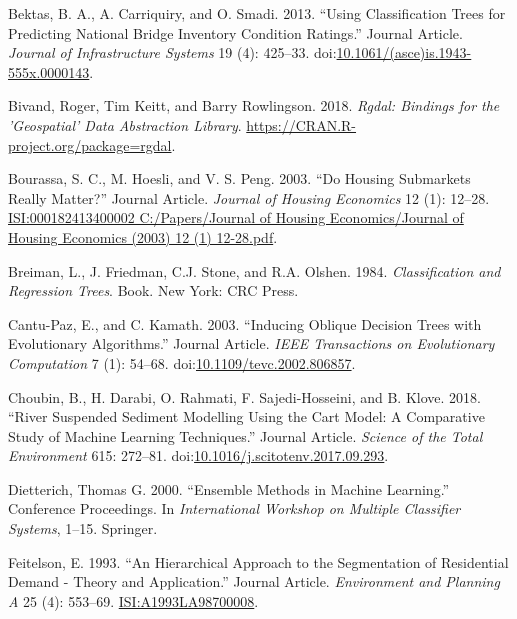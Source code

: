\documentclass[]{elsarticle} %
\begin{document}
\hypertarget{ref-Bektas2013}{}
Bektas, B. A., A. Carriquiry, and O. Smadi. 2013. ``Using Classification
Trees for Predicting National Bridge Inventory Condition Ratings.''
Journal Article. \emph{Journal of Infrastructure Systems} 19 (4):
425--33.
doi:\href{https://doi.org/10.1061/(asce)is.1943-555x.0000143}{10.1061/(asce)is.1943-555x.0000143}.

\hypertarget{ref-Bivand2018}{}
Bivand, Roger, Tim Keitt, and Barry Rowlingson. 2018. \emph{Rgdal:
Bindings for the 'Geospatial' Data Abstraction Library}.
\url{https://CRAN.R-project.org/package=rgdal}.

\hypertarget{ref-Bourassa2003}{}
Bourassa, S. C., M. Hoesli, and V. S. Peng. 2003. ``Do Housing
Submarkets Really Matter?'' Journal Article. \emph{Journal of Housing
Economics} 12 (1): 12--28.
\href{ISI:000182413400002\%0AC:/Papers/Journal\%20of\%20Housing\%20Economics/Journal\%20of\%20Housing\%20Economics\%20(2003)\%2012\%20(1)\%2012-28.pdf}{ISI:000182413400002
C:/Papers/Journal of Housing Economics/Journal of Housing Economics (2003) 12 (1) 12-28.pdf}.

\hypertarget{ref-Breiman1984}{}
Breiman, L., J. Friedman, C.J. Stone, and R.A. Olshen. 1984.
\emph{Classification and Regression Trees}. Book. New York: CRC Press.

\hypertarget{ref-Cantu-Paz2003}{}
Cantu-Paz, E., and C. Kamath. 2003. ``Inducing Oblique Decision Trees
with Evolutionary Algorithms.'' Journal Article. \emph{IEEE Transactions
on Evolutionary Computation} 7 (1): 54--68.
doi:\href{https://doi.org/10.1109/tevc.2002.806857}{10.1109/tevc.2002.806857}.

\hypertarget{ref-Choubin2018}{}
Choubin, B., H. Darabi, O. Rahmati, F. Sajedi-Hosseini, and B. Klove.
2018. ``River Suspended Sediment Modelling Using the Cart Model: A
Comparative Study of Machine Learning Techniques.'' Journal Article.
\emph{Science of the Total Environment} 615: 272--81.
doi:\href{https://doi.org/10.1016/j.scitotenv.2017.09.293}{10.1016/j.scitotenv.2017.09.293}.

\hypertarget{ref-Dietterich2000}{}
Dietterich, Thomas G. 2000. ``Ensemble Methods in Machine Learning.''
Conference Proceedings. In \emph{International Workshop on Multiple
Classifier Systems}, 1--15. Springer.

\hypertarget{ref-Feitelson1993}{}
Feitelson, E. 1993. ``An Hierarchical Approach to the Segmentation of
Residential Demand - Theory and Application.'' Journal Article.
\emph{Environment and Planning A} 25 (4): 553--69.
\url{ISI:A1993LA98700008}.
\end{document}
